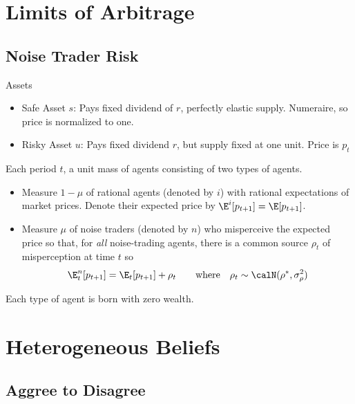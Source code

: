 \documentclass[12pt]{article}
\theoremstyle{plain}
\theoremstyle{definition}
\theoremstyle{remark}
\begin{document}
\clearpage
\section{Limits of Arbitrage}

\subsection{Noise Trader Risk}

Assets
\begin{itemize}
  \item Safe Asset $s$: Pays fixed dividend of $r$, perfectly elastic
    supply. Numeraire, so price is normalized to one.
  \item Risky Asset $u$: Pays fixed dividend $r$, but supply fixed at
    one unit. Price is $p_t$
\end{itemize}
Each period $t$, a unit mass of agents consisting of two types of
agents.
\begin{itemize}
  \item Measure $1-\mu$ of rational agents (denoted by $i$) with
    rational expectations of market prices.
    Denote their expected price by $\E^i[p_{t+1}]=\E[p_{t+1}]$.

  \item Measure $\mu$ of noise traders (denoted by $n$) who misperceive
    the expected price so that, for \emph{all} noise-trading agents,
    there is a common source $\rho_t$ of misperception at time $t$ so
    \begin{align*}
      \E^n_t[p_{t+1}]
      =
      \E_t[p_{t+1}]
      +
      \rho_t
      \qquad\text{where}\quad
      \rho_t
      \sim\calN(\rho^*,\sigma_\rho^2)
    \end{align*}
\end{itemize}
Each type of agent is born with zero wealth.



\clearpage
\section{Heterogeneous Beliefs}

\subsection{Aggree to Disagree}
\end{document}
